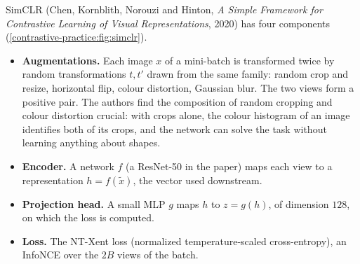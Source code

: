 \begin{notechapter}
SimCLR (Chen, Kornblith, Norouzi and Hinton, \emph{A Simple Framework for Contrastive Learning
of Visual Representations}, 2020) has four components (\cref{contrastive-practice:fig:simclr}).
\begin{itemize}
  \item \textbf{Augmentations.} Each image $x$ of a mini-batch is transformed twice by random
        transformations $t, t'$ drawn from the same family: random crop and resize, horizontal flip,
        colour distortion, Gaussian blur. The two views form a positive pair. The authors find the
        composition of random cropping and colour distortion crucial: with crops alone, the colour
        histogram of an image identifies both of its crops, and the network can solve the task
        without learning anything about shapes.
  \item \textbf{Encoder.} A network $f$ (a ResNet-50 in the paper) maps each view to a representation
        $h = f(\tilde x)$, the vector used downstream.
  \item \textbf{Projection head.} A small MLP $g$ maps $h$ to $z = g(h)$, of dimension $128$, on which the loss is computed.
  \item \textbf{Loss.} The NT-Xent loss (normalized temperature-scaled cross-entropy), an InfoNCE over the
        $2B$ views of the batch.
\end{itemize}


\end{notechapter}
